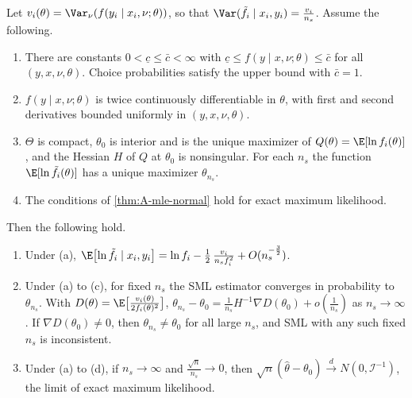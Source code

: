 \begin{proposition}\label{prop:A-sml-bias}
Let $v_i(\theta) = \Var_\nu(f(y_i \mid x_i, \nu;\theta))$, so that $\Var(\tilde f_i \mid x_i, y_i) =
\frac{v_i}{n_s}$. Assume the following.
\begin{enumerate}[label=(\alph*)]
  \item There are constants $0 < \underline{c} \le \bar c < \infty$ with $\underline{c} \le f(y \mid x, \nu;\theta) \le
  \bar c$ for all $(y, x, \nu, \theta)$. Choice probabilities satisfy the upper bound with $\bar c = 1$.
  \item $f(y \mid x, \nu;\theta)$ is twice continuously differentiable in $\theta$, with first and second derivatives
  bounded uniformly in $(y, x, \nu, \theta)$.
  \item $\Theta$ is compact, $\theta_0$ is interior and is the unique maximizer of $Q(\theta) = \E[\ln f_i(\theta)]$,
  and the Hessian $H$ of $Q$ at $\theta_0$ is nonsingular. For each $n_s$ the function $\E[\ln\tilde f_i(\theta)]$ has
  a unique maximizer $\theta_{n_s}$.
  \item The conditions of \cref{thm:A-mle-normal} hold for exact maximum likelihood.
\end{enumerate}
Then the following hold.
\begin{enumerate}[label=(\roman*)]
  \item Under (a), $\E\bigl[\ln\tilde f_i \mid x_i, y_i\bigr] = \ln f_i - \frac{1}{2}\,\frac{v_i}{n_sf_i^2} +
  O(n_s^{-\frac{3}{2}})$.
  \item Under (a) to (c), for fixed $n_s$ the SML estimator converges in probability to $\theta_{n_s}$. With
  $D(\theta) = \E\bigl[\frac{v_i(\theta)}{2f_i(\theta)^2}\bigr]$,
  $\theta_{n_s} - \theta_0 = \frac{1}{n_s}H^{-1}\nabla D(\theta_0) + o(\frac{1}{n_s})$ as $n_s \to \infty$. If
  $\nabla D(\theta_0) \ne 0$, then $\theta_{n_s} \ne \theta_0$ for all large $n_s$, and SML with any such fixed $n_s$
  is inconsistent.
  \item Under (a) to (d), if $n_s \to \infty$ and $\frac{\sqrt n}{n_s} \to 0$, then $\sqrt n(\hat\theta - \theta_0)
  \xrightarrow{d} N(0, \mathcal{I}^{-1})$, the limit of exact maximum likelihood.
\end{enumerate}
\end{proposition}

